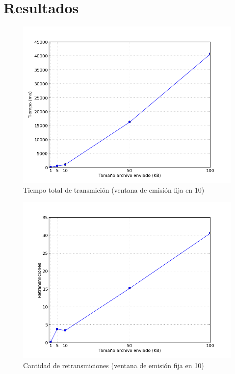 \section{Resultados}


\begin{figure}[H]
\begin{center}
\includegraphics[width=\textwidth,keepaspectratio]{tiempos.png}
\end{center}
\caption{Tiempo total de transmición (ventana de emisión fija en 10)} \label{figura1}
\end{figure}


\begin{figure}[H]
\begin{center}
\includegraphics[width=\textwidth,keepaspectratio]{retransmiciones.png}
\end{center}
\caption{Cantidad de retransmiciones (ventana de emisión fija en 10)} \label{figura2}
\end{figure}


